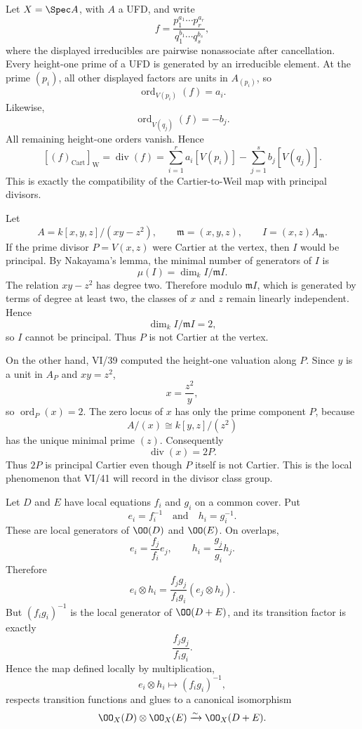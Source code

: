 \begin{solution}
Let \(X=\Spec A\), with \(A\) a UFD, and write
\[
f=\frac{p_1^{a_1}\cdots p_r^{a_r}}
        {q_1^{b_1}\cdots q_s^{b_s}},
\]
where the displayed irreducibles are pairwise nonassociate after cancellation.  Every height-one prime of a UFD is generated by an irreducible element.  At the prime \((p_i)\), all other displayed factors are units in \(A_{(p_i)}\), so
\[
\operatorname{ord}_{V(p_i)}(f)=a_i.
\]
Likewise,
\[
\operatorname{ord}_{V(q_j)}(f)=-b_j.
\]
All remaining height-one orders vanish.  Hence
\[
[(f)_{\mathrm{Cart}}]_{\mathrm W}
=\operatorname{div}(f)
=\sum_{i=1}^r a_i[V(p_i)]-
  \sum_{j=1}^s b_j[V(q_j)].
\]
This is exactly the compatibility of the Cartier-to-Weil map with principal divisors.
\end{solution}

\begin{solution}
Let
\[
A=k[x,y,z]/(xy-z^2),\qquad
\mathfrak m=(x,y,z),\qquad
I=(x,z)A_{\mathfrak m}.
\]
If the prime divisor \(P=V(x,z)\) were Cartier at the vertex, then \(I\) would be principal.  By Nakayama's lemma, the minimal number of generators of \(I\) is
\[
\mu(I)=\dim_k I/\mathfrak m I.
\]
The relation \(xy-z^2\) has degree two.  Therefore modulo \(\mathfrak m I\), which is generated by terms of degree at least two, the classes of \(x\) and \(z\) remain linearly independent.  Hence
\[
\dim_k I/\mathfrak m I=2,
\]
so \(I\) cannot be principal.  Thus \(P\) is not Cartier at the vertex.

On the other hand, VI/39 computed the height-one valuation along \(P\).  Since \(y\) is a unit in \(A_P\) and \(xy=z^2\),
\[
x=\frac{z^2}{y},
\]
so \(\operatorname{ord}_P(x)=2\).  The zero locus of \(x\) has only the prime component \(P\), because
\[
A/(x)\cong k[y,z]/(z^2)
\]
has the unique minimal prime \((z)\).  Consequently
\[
\operatorname{div}(x)=2P.
\]
Thus \(2P\) is principal Cartier even though \(P\) itself is not Cartier.  This is the local phenomenon that VI/41 will record in the divisor class group.
\end{solution}

\begin{solution}
Let \(D\) and \(E\) have local equations \(f_i\) and \(g_i\) on a common cover.  Put
\[
e_i=f_i^{-1}\quad\text{and}\quad h_i=g_i^{-1}.
\]
These are local generators of \(\OO(D)\) and \(\OO(E)\).  On overlaps,
\[
e_i=\frac{f_j}{f_i}e_j,
\qquad
h_i=\frac{g_j}{g_i}h_j.
\]
Therefore
\[
e_i\otimes h_i
=\frac{f_jg_j}{f_i g_i}(e_j\otimes h_j).
\]
But \((f_i g_i)^{-1}\) is the local generator of \(\OO(D+E)\), and its transition factor is exactly
\[
\frac{f_jg_j}{f_i g_i}.
\]
Hence the map defined locally by multiplication,
\[
e_i\otimes h_i\longmapsto(f_i g_i)^{-1},
\]
respects transition functions and glues to a canonical isomorphism
\[
\OO_X(D)\otimes\OO_X(E)\xrightarrow{\sim}\OO_X(D+E).
\]
\end{solution}

